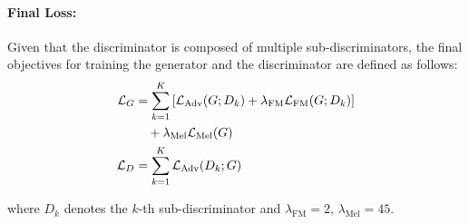 \paragraph{Final Loss:}
Given that the discriminator is composed of multiple sub-discriminators, the final objectives for training the generator and the discriminator are defined as follows:
\begin{align}
    \mathcal{L}_{G} &= \sum_{k=1}^{K} \left[\mathcal{L}_{\text{Adv}}(G; D_k) + \lambda_{\text{FM}} \mathcal{L}_{\text{FM}}(G; D_k)\right] \notag \\
    &\quad + \lambda_{\text{Mel}} \mathcal{L}_{\text{Mel}}(G) \\
    \mathcal{L}_{D} &= \sum_{k=1}^{K} \mathcal{L}_{\text{Adv}}(D_k; G)
\end{align}

where \(D_k\) denotes the \(k\)-th sub-discriminator and \(\lambda_{\text{FM}} = 2\), \(\lambda_{\text{Mel}} = 45\). 






